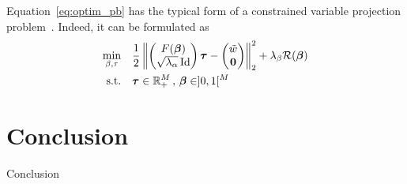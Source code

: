 Equation~\eqref{eq:optim_pb} has the typical form of a constrained variable
projection problem~\cite{Golub_G_2003_j-inv-prob_separable_nlsvpma}.
Indeed, it can be formulated as
\begin{equation}
  \begin{aligned}
    \min_{\beta,\tau} \quad &
    \frac{1}{2} \left\lVert\begin{pmatrix}F(\boldsymbol{\beta}) \\ \sqrt{\lambda_{\alpha}}\operatorname{\mathrm{Id}}\end{pmatrix}\boldsymbol{\tau}
        - \begin{pmatrix}\tilde{w}\\ \mathbf{0} \end{pmatrix}\right\rVert_{2}^{2}
    + \lambda_{\beta}\mathcal{R}(\boldsymbol{\beta}) \\
    \textrm{s.t.} \quad &
    \boldsymbol{\tau} \in \mathbb{R}^{M}_{+} \, , \, \boldsymbol{\beta} \in ]0,1[^{M}
  \end{aligned}
\end{equation}


\section{}


\section{Conclusion}
\label{sec:concl}

Conclusion
